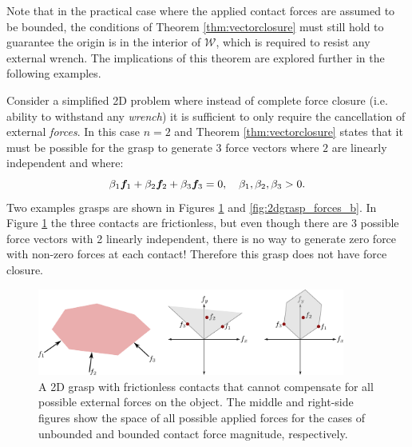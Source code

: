 Note that in the practical case where the applied contact forces are assumed to be bounded, the conditions of Theorem \ref{thm:vectorclosure} must still hold to guarantee the origin is in the interior of $\mathcal{W}$, which is required to resist any external wrench.
The implications of this theorem are explored further in the following examples.

\begin{example}
Consider a simplified 2D problem where instead of complete force closure (i.e. ability to withstand any \textit{wrench}) it is sufficient to only require the cancellation of external \textit{forces}. In this case $n=2$ and Theorem \ref{thm:vectorclosure} states that it must be possible for the grasp to generate $3$ force vectors where $2$ are linearly independent and where:
\begin{equation*}
\beta_1 \bm{f}_1 + \beta_2 \bm{f}_2 + \beta_3 \bm{f}_3 = 0, \quad \beta_1, \beta_2, \beta_3 > 0.
\end{equation*}
Two examples grasps are shown in Figures \ref{fig:2dgrasp_forces_a} and \ref{fig:2dgrasp_forces_b}. In Figure \ref{fig:2dgrasp_forces_a} the three contacts are frictionless, but even though there are 3 possible force vectors with 2 linearly independent, there is no way to generate zero force with non-zero forces at each contact! Therefore this grasp does not have force closure. 
\begin{figure}[ht]
\begin{center}
\includegraphics[width=0.9\textwidth]{tex/figs/ch26_figs/2Dexample_forces_a.png}
\caption{A 2D grasp with frictionless contacts that cannot compensate for all possible external forces on the object. The middle and right-side figures show the space of all possible applied forces for the cases of unbounded and bounded contact force magnitude, respectively.}
\label{fig:2dgrasp_forces_a}
\end{center}
\end{figure}


\end{example}
